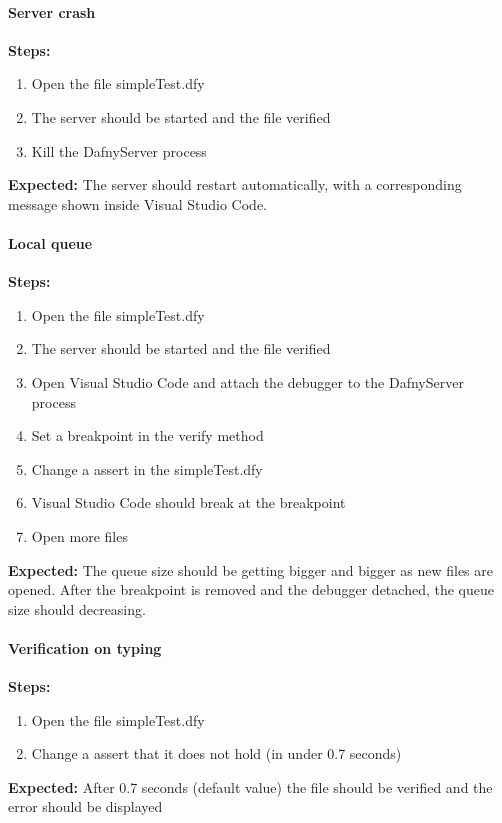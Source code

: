\paragraph{Server crash}
\textbf{\newline Steps:}
\begin{enumerate}
	\item Open the file simpleTest.dfy
	\item The server should be started and the file verified
	\item Kill the DafnyServer process
\end{enumerate}
\textbf{\newline Expected:}
The server should restart automatically, with a corresponding message shown inside Visual Studio Code. 


\paragraph{Local queue}
\textbf{\newline Steps:}
\begin{enumerate}
	\item Open the file simpleTest.dfy
	\item The server should be started and the file verified
	\item Open Visual Studio Code and attach the debugger to the DafnyServer process
	\item Set a breakpoint in the verify method
	\item Change a assert in the simpleTest.dfy 
	\item Visual Studio Code should break at the breakpoint
	\item Open more files
\end{enumerate}
\textbf{\newline Expected:}
The queue size should be getting bigger and bigger as new files are opened. After the breakpoint is removed and the debugger detached, the queue size should decreasing. 

\paragraph{Verification on typing}
\textbf{\newline Steps:}
\begin{enumerate}
	\item Open the file simpleTest.dfy
	\item Change a assert that it does not hold (in under 0.7 seconds)
\end{enumerate}
\textbf{\newline Expected:}
After 0.7 seconds (default value) the file should be verified and the error should be displayed 

